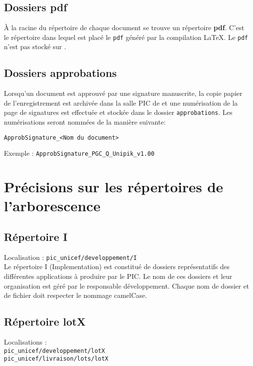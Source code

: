 \subsection{Dossiers pdf}

\`{A} la racine du répertoire de chaque document se trouve un répertoire \textbf{pdf}. C'est
le répertoire dans lequel est placé le \verb+pdf+ généré par la compilation \LaTeX{}. Le \verb+pdf+ n'est pas stocké sur \git{}.

\subsection{Dossiers approbations}

Lorsqu'un document est approuvé par une signature manuscrite, la copie papier de l'enregistrement est archivée dans la salle PIC de  \nomEquipe{} et une numérisation de la page de signatures est effectuée et stockée dans le dossier \verb+approbations+. Les numérisations seront nommées de la manière suivante:
\begin{center}
\verb+ApprobSignature_<Nom du document>+
\end{center}

Exemple : \verb+ApprobSignature_PGC_Q_Unipik_v1.00+

\section{Précisions sur les répertoires de l'arborescence}

\subsection{Répertoire I}

Localisation : \verb+pic_unicef/developpement/I+\\

Le répertoire I (Implementation) est constitué de dossiers représentatifs des différentes applications à produire par le PIC. Le nom de ces dossiers et leur organisation est géré par le responsable développement. Chaque nom de dossier et de fichier doit respecter le nommage camelCase.

\subsection{Répertoire lotX}

Localisations : \\
\verb+pic_unicef/developpement/lotX+\\
\verb+pic_unicef/livraison/lots/lotX+\\

